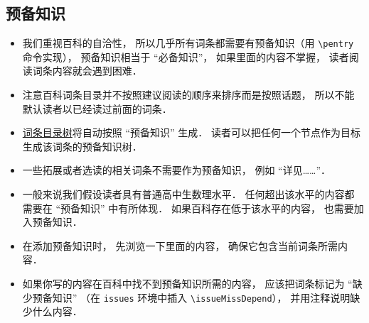 
\subsection{预备知识}
\begin{itemize}
\item 我们重视百科的自洽性， 所以几乎所有词条都需要有预备知识（用 \verb|\pentry| 命令实现）， 预备知识相当于 “必备知识”， 如果里面的内容不掌握， 读者阅读词条内容就会遇到困难．
\item 注意百科词条目录并不按照建议阅读的顺序来排序而是按照话题， 所以不能默认读者以已经读过前面的词条．
\item \href{http://wuli.wiki/tree/}{词条目录树}将自动按照 “预备知识” 生成． 读者可以把任何一个节点作为目标生成该词条的预备知识树．
\item 一些拓展或者选读的相关词条不需要作为预备知识， 例如 “详见……”．
\item 一般来说我们假设读者具有普通高中生数理水平． 任何超出该水平的内容都需要在 “预备知识” 中有所体现． 如果百科存在低于该水平的内容， 也需要加入预备知识．
\item 在添加预备知识时， 先浏览一下里面的内容， 确保它包含当前词条所需内容．
\item 如果你写的内容在百科中找不到预备知识所需的内容， 应该把词条标记为 “缺少预备知识” （在 \verb|issues| 环境中插入 \verb|\issueMissDepend|）， 并用注释说明缺少什么内容．
\end{itemize}
